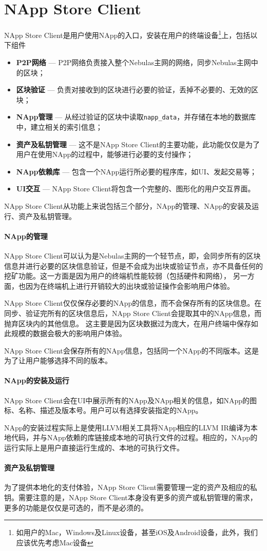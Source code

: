 \section{NApp Store Client}
NApp Store Client是用户使用NApp的入口，安装在用户的终端设备\footnote{如用户的Mac，Windows及Linux设备，甚至iOS及Android设备，此外，我们应该优先考虑Mac设备}上，包括以下组件
\begin{itemize}
\item \textbf{P2P网络} --- P2P网络负责接入整个Nebulas主网的网络，同步Nebulas主网中的区块；
\item \textbf{区块验证} --- 负责对接收到的区块进行必要的验证，丢掉不必要的、无效的区块；
\item \textbf{NApp管理} --- 从经过验证的区块中读取\texttt{napp\_data}，并存储在本地的数据库中，建立相关的索引信息；
\item \textbf{资产及私钥管理} --- 这不是NApp Store Client的主要功能，此功能仅仅是为了用户在使用NApp的过程中，能够进行必要的支付操作；
\item \textbf{NApp依赖库} --- 包含一个NApp运行所必要的程序库，如UI、发起交易等；
\item \textbf{UI交互} --- NApp Store Client将包含一个完整的、图形化的用户交互界面。
\end{itemize}

NApp Store Client从功能上来说包括三个部分，NApp的管理、NApp的安装及运行、资产及私钥管理。
\paragraph{NApp的管理}
NApp Store Client可以认为是Nebulas主网的一个轻节点，即，会同步所有的区块信息并进行必要的区块信息验证，但是不会成为出块或验证节点，亦不具备任何的挖矿功能。这一方面是因为用户的终端机性能较弱（包括硬件和网络），
另一方面，也因为在终端机上进行开销较大的出块或验证操作会影响用户体验。

NApp Store Client仅仅保存必要的NApp的信息，而不会保存所有的区块信息。在同步、验证完所有的区块信息后，NApp Store Client会提取其中的NApp信息，而抛弃区块内的其他信息。
这主要是因为区块数据过为庞大，在用户终端中保存如此规模的数据会极大的影响用户体验。

NApp Store Client会保存所有的NApp信息，包括同一个NApp的不同版本。这是为了让用户能够选择不同的版本。
\paragraph{NApp的安装及运行}
NApp Store Client会在UI中展示所有的NApp及NApp相关的信息，如NApp的图标、名称、描述及版本号。用户可以有选择安装指定的NApp。

NApp的安装过程实际上是使用LLVM相关工具将NApp相应的LLVM IR编译为本地代码，并与NApp依赖的库链接成本地的可执行文件的过程。相应的，NApp的运行实际上是用户直接运行生成的、本地的可执行文件。

\paragraph{资产及私钥管理}
为了提供本地化的支付体验，NApp Store Client需要管理一定的资产及相应的私钥。需要注意的是，NApp Store Client本身没有更多的资产或私钥管理的需求，更多的功能是仅仅是可选的，而不是必须的。

